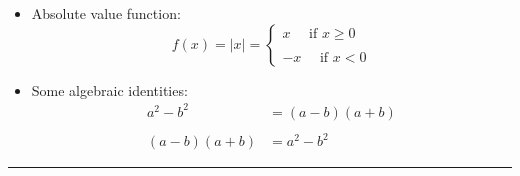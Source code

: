 \documentclass{article}
\newcommand{\<}{\langle}
\renewcommand{\>}{\rangle}
\begin{document}
\begin{itemize}
\item [d)] Absolute value function:
$$f(x)=|x|=\begin{cases}
x\quad \textrm{ if }x \geq 0 \\ \\
-x\quad \textrm{ if } x < 0
\end{cases}$$

\item [e)] Some algebraic identities: 
\begin{align*}
    a^2-b^2&=(a-b)(a+b) \\ \\
    (a-b)(a+b) &=a^2-b^2
\end{align*}
\end{itemize}

\noindent\rule{\textwidth}{.5pt}
\begin{enumerate}

\end{enumerate}
\end{document}

